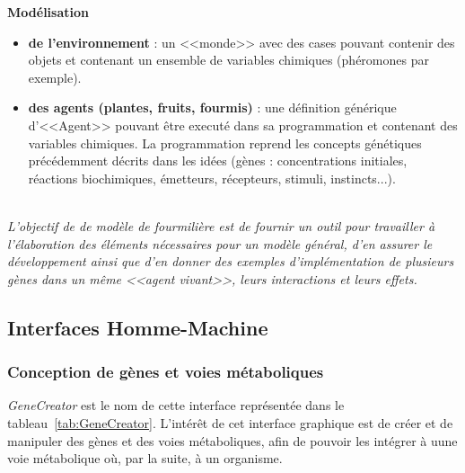 \documentclass[11pt,twoside,a4paper]{article}
\begin{document}
\textbf{Mod{\'e}lisation}
\begin{itemize} 
	\item \textbf{de l'environnement} : un <<monde>> avec des cases pouvant contenir des objets et contenant un ensemble de variables chimiques (ph{\'e}romones par exemple).
	\item \textbf{des agents (plantes, fruits, fourmis)} : une d{\'e}finition g{\'e}n{\'e}rique d'<<Agent>> pouvant {\^e}tre execut{\'e} dans sa programmation et contenant des variables chimiques. La programmation reprend les concepts g{\'e}n{\'e}tiques pr{\'e}c{\'e}demment d{\'e}crits dans les id{\'e}es (g{\`e}nes : concentrations initiales, r{\'e}actions biochimiques, {\'e}metteurs, r{\'e}cepteurs, stimuli, instincts...).
\end{itemize}~\\

\emph{L'objectif de de mod{\`e}le de fourmili{\`e}re est de fournir un outil pour travailler {\`a} l'{\'e}laboration des {\'e}l{\'e}ments n{\'e}cessaires pour un mod{\`e}le g{\'e}n{\'e}ral, d'en assurer le d{\'e}veloppement ainsi que d'en donner des exemples d'impl{\'e}mentation de plusieurs g{\`e}nes dans un m{\^e}me <<agent vivant>>, leurs interactions et leurs effets. }

\clearpage

\subsection{Interfaces Homme-Machine}

\subsubsection{Conception de g{\`e}nes et voies m{\'e}taboliques}

\emph{GeneCreator} est le nom de cette interface repr{\'e}sent{\'e}e dans le tableau~\ref{tab:GeneCreator}. L'int{\'e}r{\^e}t de cet interface graphique est de cr{\'e}er et de manipuler des g{\`e}nes et des voies m{\'e}taboliques, afin de pouvoir les int{\'e}grer {\`a} uune voie m{\'e}tabolique o{\`u}, par la suite, {\`a} un organisme.
\end{document}
